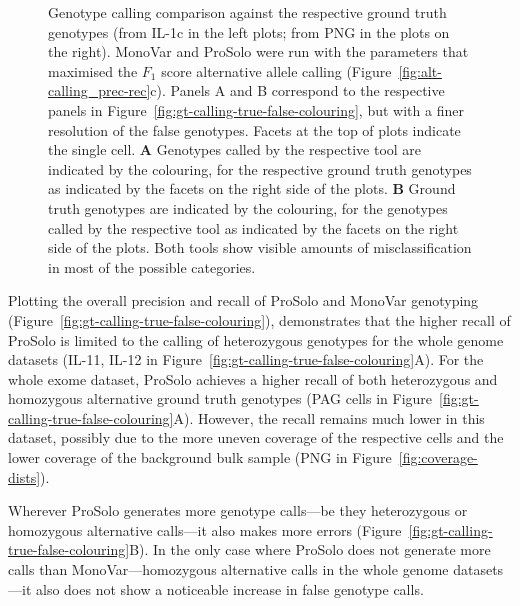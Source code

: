 \documentclass[authoryear,preprint,11pt]{scrartcl}
\begin{document}
\begin{figure}[!tpb]
\begin{minipage}{.53\linewidth}
 \end{minipage}
 \caption{
  Genotype calling comparison against the respective ground truth genotypes (from IL-1c in the left plots; from PNG in the plots on the right).
  MonoVar and ProSolo were run with the parameters that maximised the $F_1$ score alternative allele calling (Figure~\ref{fig:alt-calling_prec-rec}c).
  Panels A and B correspond to the respective panels in Figure~\ref{fig:gt-calling-true-false-colouring}, but with a finer resolution of the false genotypes.
  Facets at the top of plots indicate the single cell.
  \textbf{A} Genotypes called by the respective tool are indicated by the colouring, for the respective ground truth genotypes  as indicated by the facets on the right side of the plots.
  \textbf{B} Ground truth genotypes are indicated by the colouring, for the genotypes called by the respective tool as indicated by the facets on the right side of the plots.
  Both tools show visible amounts of misclassification in most of the possible categories.
  }
\label{fig:gt-calling-gt-colouring}
\end{figure}

Plotting the overall precision and recall of ProSolo and MonoVar genotyping (Figure~\ref{fig:gt-calling-true-false-colouring}), demonstrates that the higher recall of ProSolo is limited to the calling of heterozygous genotypes for the whole genome datasets (IL-11, IL-12 in Figure~\ref{fig:gt-calling-true-false-colouring}A).
For the whole exome dataset, ProSolo achieves a higher recall of both heterozygous and homozygous alternative ground truth genotypes (PAG cells in Figure~\ref{fig:gt-calling-true-false-colouring}A).
However, the recall remains much lower in this dataset, possibly due to the more uneven coverage of the respective cells and the lower coverage of the background bulk sample (PNG in Figure~\ref{fig:coverage-dists}).

Wherever ProSolo generates more genotype calls---be they heterozygous or homozygous alternative calls---it also makes more errors (Figure~\ref{fig:gt-calling-true-false-colouring}B).
In the only case where ProSolo does not generate more calls than MonoVar---homozygous alternative calls in the whole genome datasets---it also does not show a noticeable increase in false genotype calls.
\end{document}
